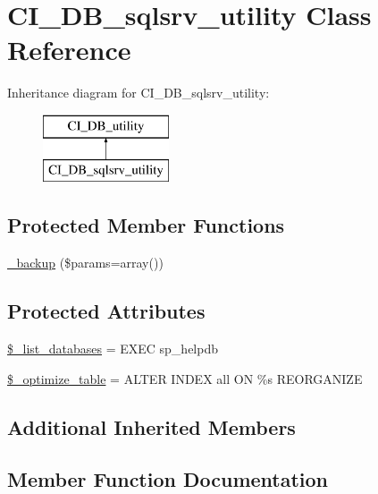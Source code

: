 \hypertarget{class_c_i___d_b__sqlsrv__utility}{}\section{C\+I\+\_\+\+D\+B\+\_\+sqlsrv\+\_\+utility Class Reference}
\label{class_c_i___d_b__sqlsrv__utility}
Inheritance diagram for C\+I\+\_\+\+D\+B\+\_\+sqlsrv\+\_\+utility\+:\begin{figure}[H]
\begin{center}
\leavevmode
\includegraphics[height=2.000000cm]{class_c_i___d_b__sqlsrv__utility}
\end{center}
\end{figure}
\subsection*{Protected Member Functions}
\begin{DoxyCompactItemize}
\item 
\mbox{\hyperlink{class_c_i___d_b__sqlsrv__utility_a30f3053d2c82e7562349924363507afa}{\+\_\+backup}} (\$params=array())
\end{DoxyCompactItemize}
\subsection*{Protected Attributes}
\begin{DoxyCompactItemize}
\item 
\mbox{\hyperlink{class_c_i___d_b__sqlsrv__utility_afe3a5b80562d93d6bc7e2b53c95b7e5a}{\$\+\_\+list\+\_\+databases}} = \textquotesingle{}E\+X\+EC sp\+\_\+helpdb\textquotesingle{}
\item 
\mbox{\hyperlink{class_c_i___d_b__sqlsrv__utility_a083199e5c22c78912dae0a47bb2d7fad}{\$\+\_\+optimize\+\_\+table}} = \textquotesingle{}A\+L\+T\+ER I\+N\+D\+EX all ON \%s R\+E\+O\+R\+G\+A\+N\+I\+ZE\textquotesingle{}
\end{DoxyCompactItemize}
\subsection*{Additional Inherited Members}


\subsection{Member Function Documentation}
\mbox{\label{class_c_i___d_b__sqlsrv__utility_a30f3053d2c82e7562349924363507afa}} 
